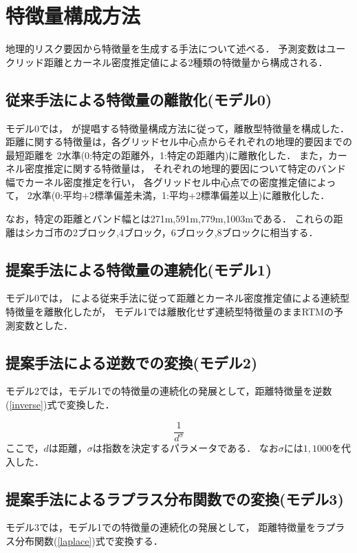 \documentclass[12pt,a4paper,oneside]{jsbook}
\theoremstyle{plain}
\begin{document}
\section{特徴量構成方法}
地理的リスク要因から特徴量を生成する手法について述べる．
予測変数はユークリッド距離とカーネル密度推定値による2種類の特徴量から構成される．


\subsection{従来手法による特徴量の離散化(モデル0)}
モデル0では，
\citet{caplan2015risk}
が提唱する特徴量構成方法に従って，離散型特徴量を構成した．
距離に関する特徴量は，各グリッドセル中心点からそれぞれの地理的要因までの最短距離を
2水準(0:特定の距離外，1:特定の距離内)に離散化した．
また，カーネル密度推定に関する特徴量は，
それぞれの地理的要因について特定のバンド幅でカーネル密度推定を行い，
各グリッドセル中心点での密度推定値によって，
2水準(0:平均+2標準偏差未満，1:平均+2標準偏差以上)に離散化した．

なお，特定の距離とバンド幅とは271m,591m,779m,1003mである．
これらの距離はシカゴ市の2ブロック,4ブロック，6ブロック,8ブロックに相当する．

\subsection{提案手法による特徴量の連続化(モデル1)}
モデル0では，\citet{caplan2015risk}
による従来手法に従って距離とカーネル密度推定値による連続型特徴量を離散化したが，
モデル1では離散化せず連続型特徴量のままRTMの予測変数とした．

\subsection{提案手法による逆数での変換(モデル2)}
モデル2では，モデル1での特徴量の連続化の発展として，距離特徴量を逆数(\ref{inverse})式で変換した．

\begin{equation}\label{inverse}
  \frac{1}{d^\sigma}
\end{equation}
ここで，$d$は距離，$\sigma$は指数を決定するパラメータである．
なお$\sigma$には$1,1000$を代入した．

\subsection{提案手法によるラプラス分布関数での変換(モデル3)}
モデル3では，モデル1での特徴量の連続化の発展として，
距離特徴量をラプラス分布関数(\ref{laplace})式で変換する．
\end{document}
